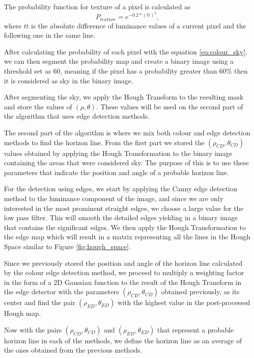 The probability function for texture of a pixel is calculated as
\begin{equation}
	P_{texture} = e^{-0.2*(tt)^{2}},
\end{equation}
where $tt$ is the absolute difference of luminance values of a current pixel and the following one in the same line.

After calculating the probability of each pixel with the equation \ref{eq:colour_sky}, we can then segment the probability map and create a binary image using a threshold set as 60, meaning if the pixel has a probability greater than 60\% then it is considered as sky in the binary image.

After segmenting the sky, we apply the Hough Transform to the resulting mask and store the values of $(\rho,\theta)$. These values will be used on the second part of the algorithm that uses edge detection methods.

The second part of the algorithm is where we mix both colour and edge detection methods to find the horizon line. From the first part we stored the $(\rho_{CD},\theta_{CD})$ values obtained by applying the Hough Transformation to the binary image containing the areas that were considered sky. The purpose of this is to use these parameters that indicate the position and angle of a probable horizon line.

For the detection using edges, we start by applying the Canny edge detection method to the luminance component of the image, and since we are only interested in the most prominent straight edges, we choose a large value for the low pass filter. This will smooth the detailed edges yielding in a binary image that contains the significant edges. We then apply the Hough Transformation to the edge map which will result in a matrix representing all the lines in the Hough Space similar to Figure \ref{fig:hough_space}.

Since we previously stored the position and angle of the horizon line calculated by the colour edge detection method, we proceed to multiply a weighting factor in the form of a 2D Gaussian function to the result of the Hough Transform in the edge detector with the parameters $(\rho_{CD},\theta_{CD})$ obtained previously, as its center and find the pair $(\rho_{ED}, \theta_{ED})$ with the highest value in the post-processed Hough map.

Now with the pairs $(\rho_{CD}, \theta_{CD})$ and $(\rho_{ED}, \theta_{ED})$ that represent a probable horizon line in each of the methods, we define the horizon line as an average of the ones obtained from the previous methods.

